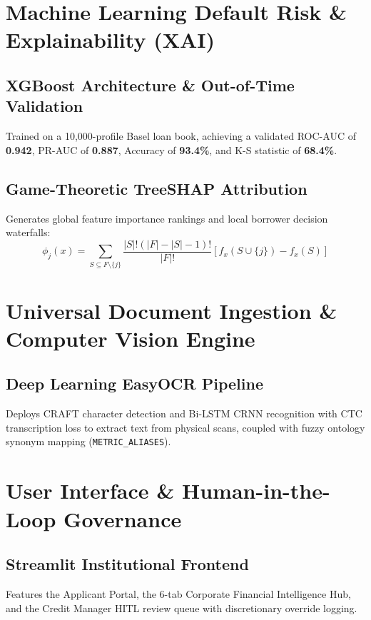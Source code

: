 \documentclass[11pt,a4paper,oneside]{report}
\begin{document}
\chapter{Machine Learning Default Risk \& Explainability (XAI)}

\section{XGBoost Architecture \& Out-of-Time Validation}
Trained on a 10,000-profile Basel loan book, achieving a validated ROC-AUC of \textbf{0.942}, PR-AUC of \textbf{0.887}, Accuracy of \textbf{93.4\%}, and K-S statistic of \textbf{68.4\%}.

\section{Game-Theoretic TreeSHAP Attribution}
Generates global feature importance rankings and local borrower decision waterfalls:
\begin{equation}
\phi_j(x) = \sum_{S \subseteq F \setminus \{j\}} \frac{|S|! (|F| - |S| - 1)!}{|F|!} [ f_x(S \cup \{j\}) - f_x(S) ]
\end{equation}

\chapter{Universal Document Ingestion \& Computer Vision Engine}

\section{Deep Learning EasyOCR Pipeline}
Deploys CRAFT character detection and Bi-LSTM CRNN recognition with CTC transcription loss to extract text from physical scans, coupled with fuzzy ontology synonym mapping (\texttt{METRIC\_ALIASES}).

\chapter{User Interface \& Human-in-the-Loop Governance}

\section{Streamlit Institutional Frontend}
Features the Applicant Portal, the 6-tab Corporate Financial Intelligence Hub, and the Credit Manager HITL review queue with discretionary override logging.
\end{document}
